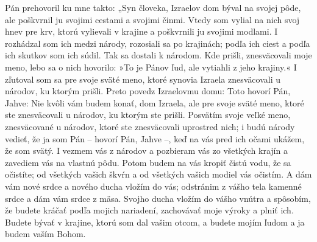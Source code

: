 Pán prehovoril ku mne takto: „Syn človeka, Izraelov dom býval na svojej pôde, ale poškvrnil ju svojimi cestami a svojimi činmi.
Vtedy som vylial na nich svoj hnev pre krv, ktorú vylievali v krajine a poškvrnili ju svojimi modlami. I rozhádzal som ich medzi národy, rozosiali sa po krajinách; podľa ich ciest a podľa ich skutkov som ich súdil. Tak sa dostali k národom. Kde prišli, znesväcovali moje meno, lebo sa o nich hovorilo: »To je Pánov ľud, ale vytiahli z jeho krajiny.« I zľutoval som sa pre svoje sväté meno, ktoré synovia Izraela znesväcovali u národov, ku ktorým prišli. 
\versseparator
Preto povedz Izraelovmu domu: Toto hovorí Pán, Jahve: Nie kvôli vám budem konať, dom Izraela, ale pre svoje sväté meno, ktoré ste znesväcovali u národov, ku ktorým ste prišli. Posvätím svoje veľké meno, znesväcované u národov, ktoré ste znesväcovali uprostred nich; i budú národy vedieť, že ja som Pán – hovorí Pán, Jahve –, keď na vás pred ich očami ukážem, že som svätý. 
\versseparator
I vezmem vás z národov a pozbieram vás zo všetkých krajín a zavediem vás na vlastnú pôdu. 
Potom budem na vás kropiť čistú vodu, že sa očistíte; od všetkých vašich škvŕn a od všetkých vašich modiel vás očistím. 
\versseparator
A dám vám nové srdce a nového ducha vložím do vás; odstránim z vášho tela kamenné srdce a dám vám srdce z mäsa. Svojho ducha vložím do vášho vnútra a spôsobím, že budete kráčať podľa mojich nariadení, zachovávať moje výroky a plniť ich. Budete bývať v krajine, ktorú som dal vašim otcom, a budete mojím ľudom a ja budem vaším Bohom.